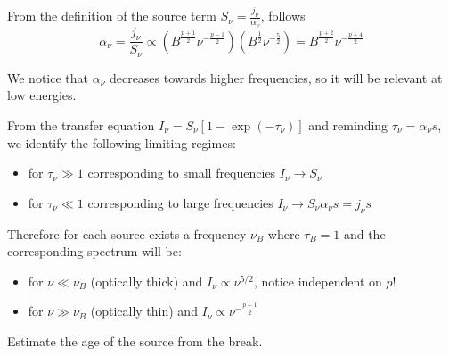 
From the definition of the source term \( S_\nu = \frac{j_\nu}{\alpha_\nu} \), follows
%
\[
\alpha_\nu = \frac{j_\nu}{S_\nu} 
\propto (B^{\frac{p+1}{2}} \nu^{-\frac{p-1}{2}}) (B^{\frac 1 2} \nu^{-\frac 5 2})
= B^{\frac{p+2}{2}} \nu^{-\frac{p + 4}{2}}
\]

We notice that $\alpha_\nu$ decreases towards higher frequencies, so it will be relevant at low energies.

From the transfer equation $I_\nu = S_\nu [1 - \exp(-\tau_\nu)]$ and reminding $\tau_\nu = \alpha_\nu s$, we identify the following limiting regimes:
%
\begin{itemize}
\item for $\tau_\nu \gg 1$ corresponding to small frequencies $I_\nu \rightarrow S_\nu$

\item for $\tau_\nu \ll 1$ corresponding to large frequencies $I_\nu \rightarrow S_\nu \alpha_\nu s = j_\nu s$
\end{itemize}

Therefore for each source exists a frequency $\nu_B$ where $\tau_B = 1$ and the corresponding spectrum will be:
%
\begin{itemize}
\item for $\nu \ll \nu_B$ (optically thick) and $I_\nu \propto \nu^{5/2}$, notice independent on $p$!

\item for $\nu \gg \nu_B$ (optically thin) and $I_\nu \propto \nu^{-\frac{p-1}{2}}$
\end{itemize}


\begin{problem} Estimate the age of the source from the break.
\end{problem}



